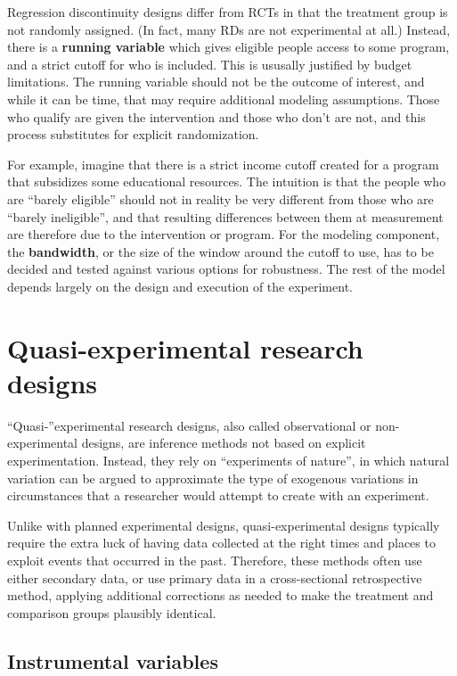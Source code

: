 Regression discontinuity designs differ from RCTs
in that the treatment group is not randomly assigned.
(In fact, many RDs are not experimental at all.)
Instead, there is a \textbf{running variable}
which gives eligible people access to some program,
and a strict cutoff for who is included.
This is ususally justified by budget limitations.
The running variable should not be the outcome of interest,
and while it can be time, that may require additional modeling assumptions.
Those who qualify are given the intervention and those who don't are not,
and this process substitutes for explicit randomization.

For example, imagine that there is a strict income cutoff created
for a program that subsidizes some educational resources.
The intuition is that the people who are ``barely eligible''
should not in reality be very different from those who are ``barely ineligible'',
and that resulting differences between them at measurement
are therefore due to the intervention or program.
For the modeling component, the \textbf{bandwidth},
or the size of the window around the cutoff to use,
has to be decided and tested against various options for robustness.
The rest of the model depends largely on the design and execution of the experiment.


\section{Quasi-experimental research designs}

``Quasi-''experimental research designs,
also called observational or non-experimental designs,
are inference methods not based on explicit experimentation.
Instead, they rely on ``experiments of nature'',
in which natural variation can be argued to approximate
the type of exogenous variations in circumstances
that a researcher would attempt to create with an experiment.

Unlike with planned experimental designs,
quasi-experimental designs typically require the extra luck
of having data collected at the right times and places
to exploit events that occurred in the past.
Therefore, these methods often use either secondary data,
or use primary data in a cross-sectional retrospective method,
applying additional corrections as needed to make
the treatment and comparison groups plausibly identical.

\subsection{Instrumental variables}

